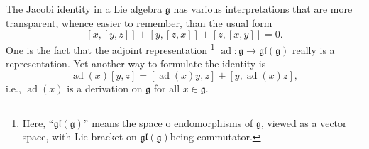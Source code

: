\documentclass[12pt]{article}
\newcommand{\ad}{\operatorname{ad}}
\begin{document}
The Jacobi identity in a Lie algebra $\mathfrak{g}$ has various interpretations that are more transparent, whence easier to remember, than the usual form
\[ [x,[y,z]]+[y,[z,x]]+[z,[x,y]]=0. \]
One is the fact that the adjoint representation 
\footnote{Here, ``$\mathfrak{gl}(\mathfrak{g})$'' means the space o
endomorphisms of $\mathfrak{g}$, viewed as a vector space, with Lie
bracket on $\mathfrak{gl}(\mathfrak{g})$being commutator.}
$\ad:\mathfrak{g} \rightarrow \mathfrak{gl}(\mathfrak{g})$ really is a representation. Yet another way to formulate the identity is 
\[ \ad(x)[y,z]=[\ad(x)y,z]+[y,\ad(x)z], \]
i.e., $\ad(x)$ is a derivation on $\mathfrak{g}$ for all $x \in \mathfrak{g}$.
\end{document}
